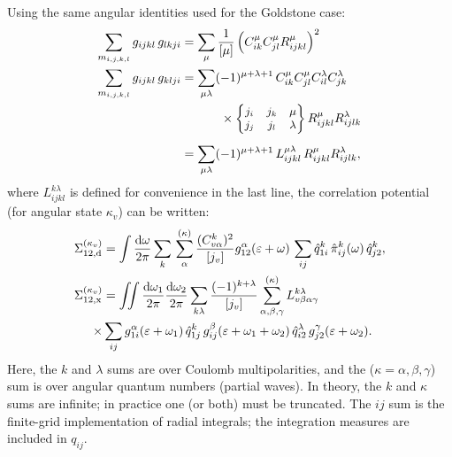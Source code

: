 \documentclass[10pt,twocolumn,a4paper]{article}%
\newcommand{\sixj}[6]{\small\ensuremath{\begin{Bmatrix}#1&#2&#3\\#4&#5&#6\end{Bmatrix}}}	%
\def\d{\ensuremath{{\rm d}}}
\def\en{\ensuremath{\varepsilon}}
\renewcommand{\a}{\ensuremath{\alpha}}
\renewcommand{\b}{\ensuremath{\beta}}
\newcommand{\g}{\ensuremath{\gamma}}
\renewcommand{\k}{\ensuremath{\kappa}}
\newcommand{\w}{\ensuremath{\omega}}
\begin{document}
Using the same angular identities used for the Goldstone case:
\begin{align}
\sum_{m_{i,j,k,l}}  g_{ijkl} \, g_{lkji}
    &= \sum_\mu \frac{1}{[\mu]} \left( C^\mu_{ik}C^\mu_{jl} R^\mu_{ijkl}\right)^2 \\
\sum_{m_{i,j,k,l}}  g_{ijkl} \, g_{klji}
        &=\sum_{\mu \lambda}(-1)^{\mu+\lambda+1}\, C^\mu_{ik}C^\mu_{jl}C^\lambda_{il}C^\lambda_{jk} \notag \\
    &\phantom{=\sum_{\mu \lambda}}~~\times \sixj{j_i}{j_k}{\mu}{j_j}{j_l}{\lambda}R^\mu_{ijkl}R^\lambda_{ijlk}\\
            &=\sum_{\mu \lambda}(-1)^{\mu+\lambda+1} \, L^{\mu\lambda}_{ijkl} \, R^\mu_{ijkl}R^\lambda_{ijlk},
\end{align}
where $L^{k\lambda}_{ijkl}$ is defined for convenience in the last line,
the correlation potential (for angular state $\k_v$) can be written:
\begin{align}
\Sigma^{(\k_v)}_{12,{\rm d}}
&= \int\frac{\d \w}{2\pi} \sum_k\,\sum_{\alpha}^{(\kappa)} \frac{ (C^k_{v\a})^2}{[j_v]}
g^{\alpha}_{12}(\en+\w) \, \sum_{ij} \hat q^k_{1i} \, \hat \pi_{ij}^{k}(\w) \, \hat q^k_{j2},
\label{eq:RadialSigmaDir}
\\
\Sigma^{(\k_v)}_{12,{\rm x}}
&= \iint\frac{\d\w_1}{2\pi} \frac{\d\w_2}{2\pi} \sum_{k\lambda}\frac{(-1)^{k+\lambda}}{[j_v]}
\sum^{(\k)}_{\a,\b,\g} 
L_{v\b\a\g}^{k\lambda}
\notag\\
\times&\sum_{ij}  g^\a_{1i}(\en+\w_1)\,\hat q^k_{1j}\,g^\b_{ij}(\en+\w_1+\w_2)\,\hat q^\lambda_{i2}\,g^\g_{j2}(\en+\w_2).
\label{eq:RadialSigmaExch}
\end{align}
Here, the $k$ and $\lambda$ sums are over Coulomb multipolarities, and the ($\k=\a,\b,\g$) sum is over angular quantum numbers (partial waves).
In theory, the $k$ and $\kappa$ sums are infinite; in practice one (or both) must be truncated.
The $ij$ sum is the finite-grid implementation of radial integrals; the integration measures are included in $q_{ij}$.
\end{document}
